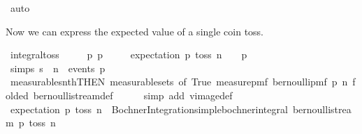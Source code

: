 \begin{isabellebody}
\ auto%
\endisatagproof
{\isafoldproof}%
%
\isadelimproof
%
\endisadelimproof
%
\begin{isamarkuptext}%
Now we can express the expected value of a single coin toss.%
\end{isamarkuptext}\isamarkuptrue%
\isamarkupfalse%
\ integral{\isacharunderscore}{\kern0pt}toss{\isacharcolon}{\kern0pt}\isanewline
\ \ \ {\isachardoublequoteopen}{}\ {\isasymle}\ p{\isachardoublequoteclose}\ {\isachardoublequoteopen}p\ {\isasymle}\ {}{\isachardoublequoteclose}\isanewline
\ \ \ {\isachardoublequoteopen}expectation\ p\ {\isacharparenleft}{\kern0pt}toss\ n{\isacharparenright}{\kern0pt}\ {\isacharequal}{\kern0pt}\ {}\ {\isacharasterisk}{\kern0pt}\ p\ {\isacharminus}{\kern0pt}\ {}{\isachardoublequoteclose}\isanewline
%
\isadelimproof
%
\endisadelimproof
%
\isatagproof
{}\isamarkupfalse%
\ {\isacharminus}{\kern0pt}\isanewline
\ \ \isamarkupfalse%
\ {\isacharbrackleft}{\kern0pt}simp{\isacharbrackright}{\kern0pt}{\isacharcolon}{\kern0pt}{\isachardoublequoteopen}{\isacharbraceleft}{\kern0pt}s{\isachardot}{\kern0pt}\ s\ {\isacharbang}{\kern0pt}{\isacharbang}{\kern0pt}\ n{\isacharbraceright}{\kern0pt}\ {\isasymin}\ events\ p{\isachardoublequoteclose}\ \isamarkupfalse%
\ measurable{\isacharunderscore}{\kern0pt}snth{\isacharbrackleft}{\kern0pt}THEN\ measurable{\isacharunderscore}{\kern0pt}sets{\isacharcomma}{\kern0pt}\ of\ {\isachardoublequoteopen}{\isacharbraceleft}{\kern0pt}True{\isacharbraceright}{\kern0pt}{\isachardoublequoteclose}\ {\isachardoublequoteopen}measure{\isacharunderscore}{\kern0pt}pmf\ {\isacharparenleft}{\kern0pt}bernoulli{\isacharunderscore}{\kern0pt}pmf\ p{\isacharparenright}{\kern0pt}{\isachardoublequoteclose}\ n{\isacharcomma}{\kern0pt}\ folded\ bernoulli{\isacharunderscore}{\kern0pt}stream{\isacharunderscore}{\kern0pt}def{\isacharbrackright}{\kern0pt}\isanewline
\ \ \ \ \isamarkupfalse%
\ {\isacharparenleft}{\kern0pt}simp\ add{\isacharcolon}{\kern0pt}\ vimage{\isacharunderscore}{\kern0pt}def{\isacharparenright}{\kern0pt}\isanewline
\ \ \isamarkupfalse%
\ {\isachardoublequoteopen}expectation\ p\ {\isacharparenleft}{\kern0pt}toss\ n{\isacharparenright}{\kern0pt}\ {\isacharequal}{\kern0pt}\ Bochner{\isacharunderscore}{\kern0pt}Integration{\isachardot}{\kern0pt}simple{\isacharunderscore}{\kern0pt}bochner{\isacharunderscore}{\kern0pt}integral\ {\isacharparenleft}{\kern0pt}bernoulli{\isacharunderscore}{\kern0pt}stream\ p{\isacharparenright}{\kern0pt}\ {\isacharparenleft}{\kern0pt}toss\ n{\isacharparenright}{\kern0pt}{\isachardoublequoteclose}\isanewline

\end{isabellebody}
